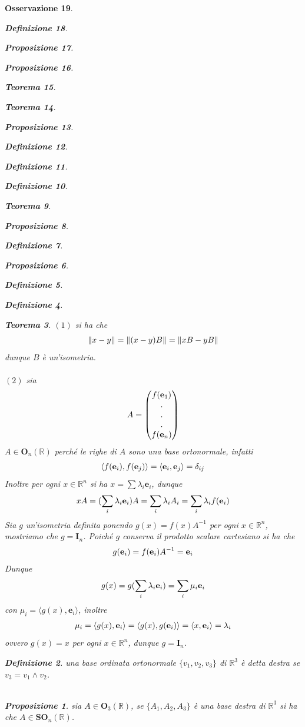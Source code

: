 \documentclass[oneside, 11pt]{amsbook}
\makeatletter
\newcommand{\0}{{(0)}}
\newcommand{\3}{{(3)}}
\theoremstyle{colonplain}
\newtheorem{thm}{Teorema}[chapter]
\newtheorem{prop}[thm]{Proposizione}
\theoremstyle{colondefinition}
\newtheorem{defn}[thm]{Definizione}
\theoremstyle{colonremark}
\newtheorem{rmk}[thm]{Osservazione}
\numberwithin{equation}{chapter}
\renewcommand{\proofname}{Dimostrazione}
\renewenvironment{proof}[1][\proofname]{\par
  \pushQED{\end{proof}}%
  \normalfont \topsep6\p@\@plus6\p@\relax
  \trivlist
  \item[\hskip\labelsep\bfseries #1:]\ignorespaces
}{%
  \popQED\endtrivlist\@endpefalse
}
\makeatother
\begin{document}
\begin{rmk}
\begin{defn}
\begin{prop}
\begin{prop}
\begin{thm}
\begin{thm}
\begin{prop}
\begin{defn}
\begin{defn}
\begin{defn}
\begin{thm}
\begin{prop}
\begin{defn}
\begin{prop}
\begin{defn}
\begin{defn}
\begin{thm}
\begin{proof} $(1)$ si ha che
\begin{align}
    \| x - y \| = \| (x - y)B \| = \| xB - yB \| \notag
\end{align}
dunque $B$ è un'isometria. \\ \\
$(2)$ sia
\begin{align}
    A = \begin{pmatrix}
        f(\mathbf{e}_1) \\
        . \\
        . \\
        . \\
        f(\mathbf{e}_n)
    \end{pmatrix} \notag
\end{align}
$A \in \mathbf{O}_n(\mathbb{R})$ perché le righe di $A$ sono una base ortonormale, infatti
\begin{align}
    \langle f(\mathbf{e}_i), f(\mathbf{e}_j) \rangle = \langle \mathbf{e}_i, \mathbf{e}_j \rangle = \delta_{ij} \notag
\end{align}
Inoltre per ogni $x \in \mathbb{R}^n$ si ha $x = \sum \lambda_i \mathbf{e}_i$, dunque
\begin{align}
    xA = (\sum_i \lambda_i \mathbf{e}_i)A = \sum_i \lambda_i A_i = \sum_i \lambda_i f(\mathbf{e}_i) \notag
\end{align}
Sia $g$ un'isometria definita ponendo $g(x) = f(x)A^{-1}$ per ogni $x \in \mathbb{R}^n$, mostriamo che $g = \mathbf{I}_n$. Poiché $g$ conserva il prodotto scalare cartesiano si ha che
\begin{align}
    g(\mathbf{e}_i) = f(\mathbf{e}_i)A^{-1} = \mathbf{e}_i \notag
\end{align}
Dunque
\begin{align}
    g(x) = g(\sum_i \lambda_i \mathbf{e}_i) = \sum_i \mu_i \mathbf{e}_i \notag
\end{align}
con $\mu_i = \langle g(x), \mathbf{e}_i \rangle$, inoltre
\begin{align}
    \mu_i = \langle g(x), \mathbf{e}_i \rangle = \langle g(x), g(\mathbf{e}_i) \rangle = \langle x, \mathbf{e}_i \rangle = \lambda_i \notag 
\end{align}
ovvero $g(x) = x$ per ogni $x \in \mathbb{R}^n$, dunque $g = \mathbf{I}_n$. \end{proof}
\begin{defn} una base ordinata ortonormale $\{ v_1, v_2, v_3 \}$ di $\mathbb{R}^3$ è detta \textit{destra} se $v_3 = v_1 \wedge v_2$. \\ \\
\begin{prop} sia $A \in \mathbf{O}_3(\mathbb{R})$, se $\{ A_1, A_2, A_3 \}$ è una base destra di $\mathbb{R}^3$ si ha che $A \in \mathbf{SO}_n(\mathbb{R})$. \\


\end{prop}
\end{defn}
\end{thm}
\end{defn}
\end{defn}
\end{prop}
\end{defn}
\end{prop}
\end{thm}
\end{defn}
\end{defn}
\end{defn}
\end{prop}
\end{thm}
\end{thm}
\end{prop}
\end{prop}
\end{defn}
\end{rmk}
\end{document}
